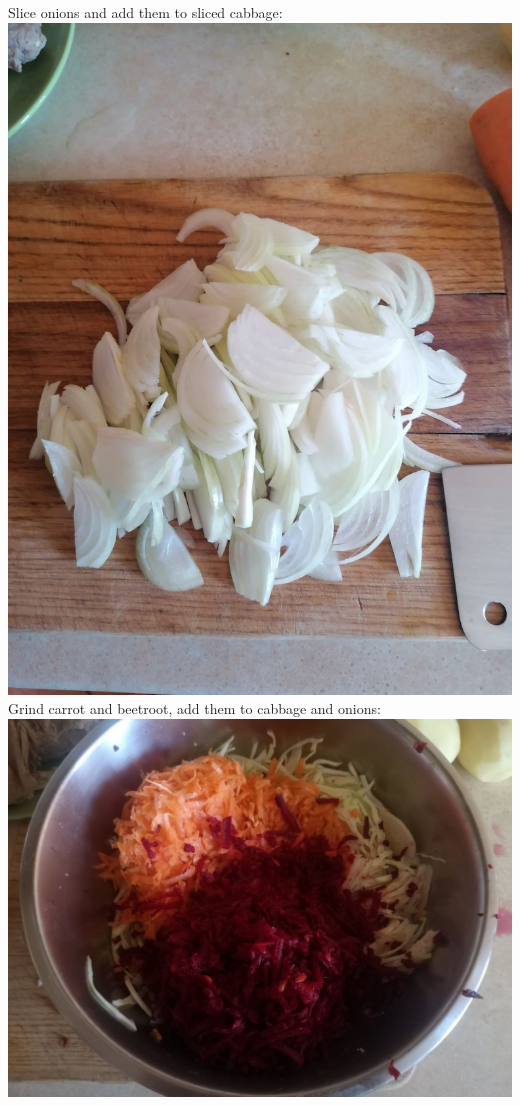 \documentclass[11pt,a4paper]{article}
\begin{document}
Slice onions and add them to sliced cabbage: \\
\includegraphics[width=\textwidth]{7.jpg} \\

Grind carrot and beetroot, add them to cabbage and onions: \\
\includegraphics[width=\textwidth]{8.jpg} \\
\end{document}
